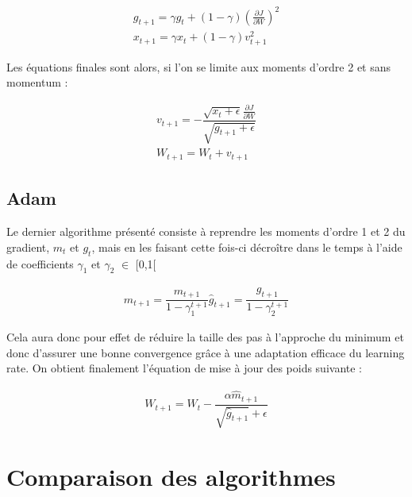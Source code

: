 \begin{equation} 
\begin{aligned}
g_{t+1} = \gamma g_t + (1-\gamma) (\frac{\partial J}{\partial W})^2 \\
x_{t+1} = \gamma x_t + (1-\gamma)v^2_{t+1}
\end{aligned}
\end{equation}


Les équations finales sont alors, si l'on se limite aux moments d'ordre 2 et sans momentum :

\begin{equation}
\begin{aligned}
v_{t+1} = - \dfrac{\sqrt{x_t + \epsilon}\frac{\partial J}{\partial W}}{\sqrt{g_{t+1}+\epsilon}}\\
W_{t+1} = W_t + v_{t+1}
\end{aligned}
\end{equation}
 
\subsection{Adam}

Le dernier algorithme présenté consiste à reprendre les moments d'ordre 1 et 2 du gradient, $m_t$ et $g_t$, mais en les faisant cette fois-ci décroître dans le temps à l'aide de coefficients $\gamma_1$ et $\gamma_2$ $\in$ [0,1[

\begin{equation}
\begin{aligned}
\hat{m}_{t+1}=\dfrac{m_{t+1}}{1-\gamma^{t+1}_1}
\hat{g}_{t+1}=\dfrac{g_{t+1}}{1-\gamma^{t+1}_2}
\end{aligned}
\end{equation}

Cela aura donc pour effet de réduire la taille des pas à l'approche du minimum et donc d'assurer une bonne convergence grâce à une adaptation efficace du learning rate. On obtient finalement l'équation de mise à jour des poids suivante :

\begin{equation}
\begin{aligned}
W_{t+1}=W_t - \dfrac{\alpha\hat{m}_{t+1}}{\sqrt{\hat{g}_{t+1}}+\epsilon}
\end{aligned}
\end{equation}

\section{Comparaison des algorithmes}

